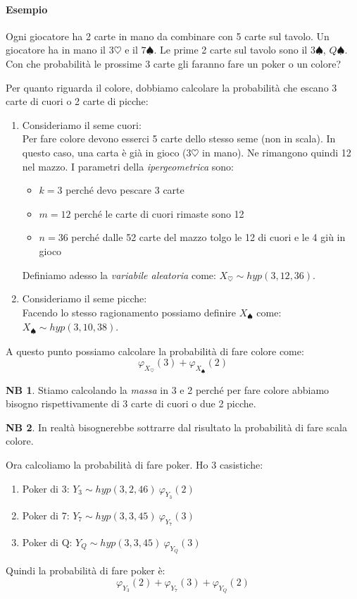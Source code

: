 \documentclass[12pt, a4paper]{report}
\theoremstyle{definition}
\newtheorem*{note}{NB}
\begin{document}
\paragraph*{Esempio}
Ogni giocatore ha 2 carte in mano da combinare con 5 carte sul tavolo. Un giocatore
ha in mano il $3\heartsuit$ e il $7\spadesuit$. Le prime 2 carte sul tavolo sono
il $3\spadesuit$, $Q\spadesuit$. Con che probabilità le prossime 3 carte gli
faranno fare un poker o un colore?

Per quanto riguarda il colore, dobbiamo calcolare la probabilità che escano 3
carte di cuori o 2 carte di picche:
\begin{enumerate}[label=(\roman*)]
	\item Consideriamo il seme cuori:\\
	Per fare colore devono esserci 5 carte dello stesso seme (non in scala). In
	questo caso, una carta è già in gioco ($3\heartsuit$ in mano). Ne rimangono
	quindi 12 nel mazzo. I parametri della \emph{ipergeometrica} sono:
	\begin{itemize}
		\item $k=3$ perché devo pescare 3 carte
		\item $m=12$ perché le carte di cuori rimaste sono 12
		\item $n=36$ perché dalle 52 carte del mazzo tolgo le 12 di cuori e le 4
		giù in gioco
	\end{itemize}
	Definiamo adesso la \emph{variabile aleatoria} come:
	\(X_{\heartsuit}\sim hyp(3,12,36)\).
	\item Consideriamo il seme picche:\\
	Facendo lo stesso ragionamento possiamo definire $X_{\spadesuit}$ come:
	\(X_{\spadesuit}\sim hyp(3,10,38)\).
\end{enumerate}
A questo punto possiamo calcolare la probabilità di fare colore come:
\[\varphi_{X_\heartsuit}(3)+\varphi_{X_\spadesuit}(2)\]

\begin{note}
	Stiamo calcolando la \emph{massa} in 3 e 2 perché per fare colore abbiamo
	bisogno rispettivamente di 3 carte di cuori o due 2 picche.
\end{note}
\begin{note}
	In realtà bisognerebbe sottrarre dal risultato la probabilità di fare scala
	colore.
\end{note}

Ora calcoliamo la probabilità di fare poker. Ho 3 casistiche:
\begin{enumerate}[label=(\roman*)]
	\item Poker di 3: \(Y_3\sim hyp(3,2,46)\ \varphi_{Y_3}(2)\)
	\item Poker di 7: \(Y_7\sim hyp(3,3,45)\ \varphi_{Y_7}(3)\)
	\item Poker di Q: \(Y_Q\sim hyp(3,3,45)\ \varphi_{Y_Q}(3)\)
\end{enumerate}
Quindi la probabilità di fare poker è:
\[\varphi_{Y_3}(2)+\varphi_{Y_7}(3)+\varphi_{Y_Q}(2)\]
\end{document}
